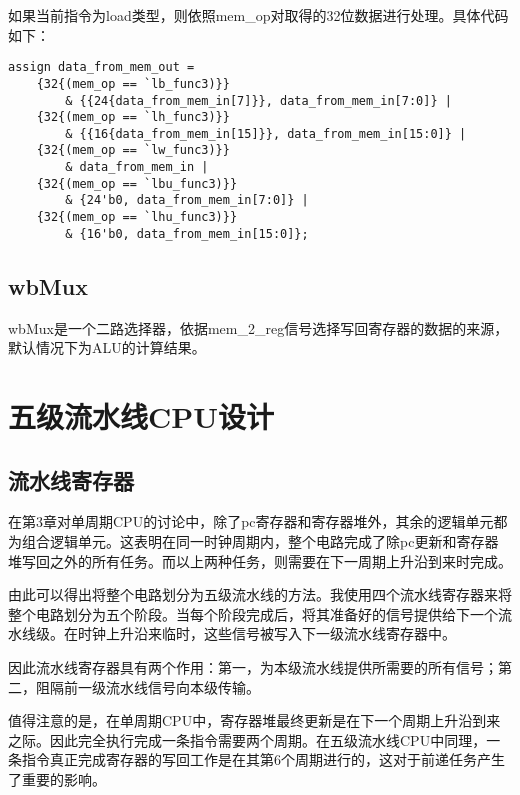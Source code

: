 \documentclass{article}
\begin{document}
            \par{}
            如果当前指令为load类型，则依照mem\_op对取得的32位数据进行处理。具体代码如下：

            \begin{verbatim}
assign data_from_mem_out = 
    {32{(mem_op == `lb_func3)}} 
        & {{24{data_from_mem_in[7]}}, data_from_mem_in[7:0]} |
    {32{(mem_op == `lh_func3)}} 
        & {{16{data_from_mem_in[15]}}, data_from_mem_in[15:0]} |
    {32{(mem_op == `lw_func3)}} 
        & data_from_mem_in |
    {32{(mem_op == `lbu_func3)}} 
        & {24'b0, data_from_mem_in[7:0]} |
    {32{(mem_op == `lhu_func3)}} 
        & {16'b0, data_from_mem_in[15:0]};
            \end{verbatim}

        \subsection{wbMux}
            \par{}
            wbMux是一个二路选择器，依据mem\_2\_reg信号选择写回寄存器的数据的来源，默认情况下为ALU的计算结果。

    \newpage{}
    \section{五级流水线CPU设计}
        \subsection{流水线寄存器}
        \par{}
        在第3章对单周期CPU的讨论中，除了pc寄存器和寄存器堆外，其余的逻辑单元都为组合逻辑单元。这表明在同一时钟周期内，整个电路完成了除pc更新和寄存器堆写回之外的所有任务。而以上两种任务，则需要在下一周期上升沿到来时完成。
        \par{}
        由此可以得出将整个电路划分为五级流水线的方法。我使用四个流水线寄存器来将整个电路划分为五个阶段。当每个阶段完成后，将其准备好的信号提供给下一个流水线级。在时钟上升沿来临时，这些信号被写入下一级流水线寄存器中。
        \par{}
        因此流水线寄存器具有两个作用：第一，为本级流水线提供所需要的所有信号；第二，阻隔前一级流水线信号向本级传输。
        \par{}
        值得注意的是，在单周期CPU中，寄存器堆最终更新是在下一个周期上升沿到来之际。因此完全执行完成一条指令需要两个周期。在五级流水线CPU中同理，一条指令真正完成寄存器的写回工作是在其第6个周期进行的，这对于前递任务产生了重要的影响。
\end{document}
